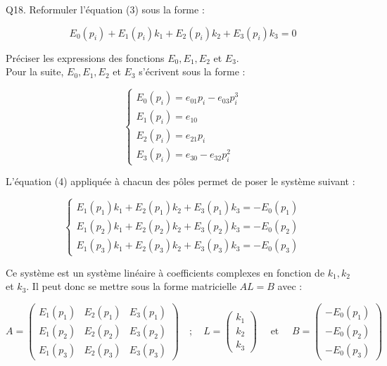 \documentclass[10pt]{article}
\begin{document}
Q18. Reformuler l'équation (3) sous la forme :


\begin{equation*}
E_{0}\left(p_{i}\right)+E_{1}\left(p_{i}\right) k_{1}+E_{2}\left(p_{i}\right) k_{2}+E_{3}\left(p_{i}\right) k_{3}=0 \tag{4}
\end{equation*}


Préciser les expressions des fonctions $E_{0}, E_{1}, E_{2}$ et $E_{3}$.\\
Pour la suite, $E_{0}, E_{1}, E_{2}$ et $E_{3}$ s'écrivent sous la forme :

$$
\left\{\begin{array}{l}
E_{0}\left(p_{i}\right)=e_{01} p_{i}-e_{03} p_{i}^{3} \\
E_{1}\left(p_{i}\right)=e_{10} \\
E_{2}\left(p_{i}\right)=e_{21} p_{i} \\
E_{3}\left(p_{i}\right)=e_{30}-e_{32} p_{i}^{2}
\end{array}\right.
$$

L'équation (4) appliquée à chacun des pôles permet de poser le système suivant :

$$
\left\{\begin{array}{l}
E_{1}\left(p_{1}\right) k_{1}+E_{2}\left(p_{1}\right) k_{2}+E_{3}\left(p_{1}\right) k_{3}=-E_{0}\left(p_{1}\right) \\
E_{1}\left(p_{2}\right) k_{1}+E_{2}\left(p_{2}\right) k_{2}+E_{3}\left(p_{2}\right) k_{3}=-E_{0}\left(p_{2}\right) \\
E_{1}\left(p_{3}\right) k_{1}+E_{2}\left(p_{3}\right) k_{2}+E_{3}\left(p_{3}\right) k_{3}=-E_{0}\left(p_{3}\right)
\end{array}\right.
$$

Ce système est un système linéaire à coefficients complexes en fonction de $k_{1}, k_{2}$ et $k_{3}$. Il peut donc se mettre sous la forme matricielle $A L=B$ avec :

$$
A=\left(\begin{array}{lll}
E_{1}\left(p_{1}\right) & E_{2}\left(p_{1}\right) & E_{3}\left(p_{1}\right) \\
E_{1}\left(p_{2}\right) & E_{2}\left(p_{2}\right) & E_{3}\left(p_{2}\right) \\
E_{1}\left(p_{3}\right) & E_{2}\left(p_{3}\right) & E_{3}\left(p_{3}\right)
\end{array}\right) \quad ; \quad L=\left(\begin{array}{c}
k_{1} \\
k_{2} \\
k_{3}
\end{array}\right) \quad \text { et } \quad B=\left(\begin{array}{c}
-E_{0}\left(p_{1}\right) \\
-E_{0}\left(p_{2}\right) \\
-E_{0}\left(p_{3}\right)
\end{array}\right)
$$
\end{document}
